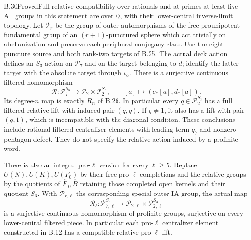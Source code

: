\begin{statement}{B.30}{Proved}{Full relative compatibility over rationals and at primes at least five}
All groups in this statement are over $\mathbb Q$, with their
lower-central inverse-limit topology. Let $\mathcal P_r$ be the
group of outer automorphisms of the free prounipotent fundamental
group of an $(r+1)$-punctured sphere which act trivially on
abelianization and preserve each peripheral conjugacy class.
Use the eight-puncture source and both rank-two targets of B.25.
The actual deck action defines an $S_3$-action on $\mathcal P_7$
and on the target belonging to $d$; identify the latter target
with the absolute target through $\iota_U$. There is a surjective
continuous filtered homomorphism
\[
 \mathcal R:\mathcal P_7^{S_3}
       \longrightarrow\mathcal P_2\times\mathcal P_2^{S_3},
 \qquad [a]\longmapsto(c_*[a],d_*[a]).
\]
Its degree-$n$ map is exactly $R_n$ of B.26. In particular every
$q\in\mathcal P_2^{S_3}$ has a full filtered relative lift with
induced pair $(q,q)$. If $q\ne1$, it also has a lift with pair
$(q,1)$, which is incompatible with the diagonal condition.
These conclusions include rational filtered centralizer elements
with leading term $q_7$ and nonzero pentagon defect. They do not
specify the relative action induced by a profinite word.

There is also an integral pro-$\ell$ version for every
$\ell\ge5$. Replace $U(N),U(K),U(F_0)$ by their free
pro-$\ell$ completions and the relative groups by the
quotients of $\widehat F_0,\widehat B$ retaining those
completed open kernels and their quotient $S_3$.
With $\mathcal P_{r,\ell}$ the corresponding special
outer IA group, the actual map
\[
 \mathcal R_\ell:\mathcal P_{7,\ell}^{S_3}
       \longrightarrow
       \mathcal P_{2,\ell}\times\mathcal P_{2,\ell}^{S_3}
\]
is a surjective continuous homomorphism of profinite groups,
surjective on every lower-central filtered piece. In
particular each pro-$\ell$ centralizer element constructed
in B.12 has a compatible relative pro-$\ell$ lift.
\end{statement}
